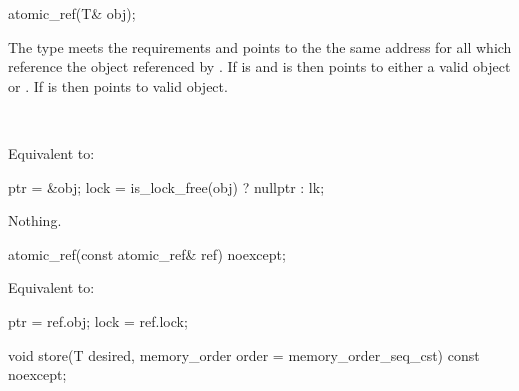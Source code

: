 \begin{itemdecl}
atomic_ref(T& obj);
\end{itemdecl}

\begin{itemdescr}
\pnum
{} 
\begin{addedblock}
\expects The type  meets the  requirements
and  points to the  the same address for all  which 
reference the object referenced by .
If  is  and  is 
then  points to either a valid  object or .
If  is  then  points to valid  object.
\end{addedblock}

\pnum
\effects {}\\
\begin{addedblock}Equivalent to:
\begin{codeblock}
  ptr = &obj;
  lock = is_lock_free(obj) ? nullptr : lk;
\end{codeblock}
\end{addedblock}

\pnum
\throws Nothing.
\end{itemdescr}

\begin{itemdecl}
atomic_ref(const atomic_ref& ref) noexcept;
\end{itemdecl}

\begin{itemdescr}
\pnum
\effects {}
\begin{addedblock}Equivalent to:
\begin{codeblock}
  ptr = ref.obj;
  lock = ref.lock;
\end{codeblock}
\end{addedblock}

\end{itemdescr}

\begin{itemdecl}
void store(T desired, memory_order order = memory_order_seq_cst) const noexcept;
\end{itemdecl}

